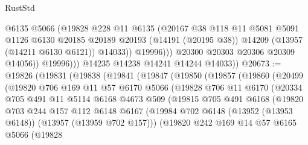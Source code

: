 \begin{lexlean}{RustStd}
\begin{coremodule}
                        @6135
                        @5066
                        (@19828
                          @228
                          @11
                          @6135
                          (@20167
                            @38
                            @118
                            @11
                            @5081
                            @5091
                            @1126
                            @6130
                            @20185
                            @20189
                            @20193
                            (@14191 (@20195 @38))
                            @14209
                            (@13957 (@14211 @6130 @6121))
                            @14033))
                        @19996)))
                  @20300
                  @20303
                  @20306
                  @20309
                  @14056))
              @19996)))
        @14235
        @14238
        @14241
        @14244
        @14033))
@20673 := @19826
    (@19831
      (@19838
        (@19841
          (@19847
            (@19850
              (@19857
                (@19860
                  (@20499
                    (@19820
                      @706
                      @169
                      @11
                      @57
                      @6170
                      @5066
                      (@19828
                        @706
                        @11
                        @6170
                        (@20334
                          @705
                          @491
                          @11
                          @5114
                          @6168
                          @4673
                          @509
                          (@19815
                            @705
                            @491
                            @6168
                            (@19820
                              @703
                              @244
                              @157
                              @112
                              @6148
                              @6167
                              (@19984
                                @702
                                @6148
                                (@13952 (@13953 @6148))
                                (@13957 (@13959 @702 @157)))
                              (@19820
                                @242
                                @169
                                @14
                                @57
                                @6165
                                @5066
                                (@19828

\end{coremodule}
\end{lexlean}
